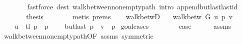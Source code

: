\begin{isabellebody}
\ \ \ \ \ \ \isamarkupfalse%
\ {\isacharparenleft}{\kern0pt}fastforce\ dest{\isacharcolon}{\kern0pt}\ walk{\isacharunderscore}{\kern0pt}between{\isacharunderscore}{\kern0pt}nonempty{\isacharunderscore}{\kern0pt}path{\isacharparenleft}{\kern0pt}{}{\isacharparenright}{\kern0pt}\ intro{\isacharcolon}{\kern0pt}\ append{\isacharunderscore}{\kern0pt}butlast{\isacharunderscore}{\kern0pt}last{\isacharunderscore}{\kern0pt}id{\isacharparenright}{\kern0pt}\isanewline
\ \ \ \ \isamarkupfalse%
\ \isamarkupfalse%
\ {\isacharquery}{\kern0pt}thesis\isanewline
\ \ \ \ \ \ \isamarkupfalse%
\ {\isacharparenleft}{\kern0pt}metis\ {\isachardoublequoteopen}{}{\isachardot}{\kern0pt}prems{\isachardoublequoteclose}{\isacharparenleft}{\kern0pt}{}{\isacharparenright}{\kern0pt}{\isacharparenright}{\kern0pt}\isanewline
\ \ \isamarkupfalse%
\isanewline
{}\isamarkupfalse%
%
\endisatagproof
{\isafoldproof}%
%
\isadelimproof
\isanewline
%
\endisadelimproof
%
\isadeliminvisible
\isanewline
%
\endisadeliminvisible
%
\isataginvisible
{}\isamarkupfalse%
\ walk{\isacharunderscore}{\kern0pt}betwD{\isacharcolon}{\kern0pt}\isanewline
\ \ \ {\isachardoublequoteopen}walk{\isacharunderscore}{\kern0pt}betw\ G\ u\ p\ v{\isachardoublequoteclose}\isanewline
\ \ \isanewline
\ \ \ \ {\isachardoublequoteopen}u\ {\isacharhash}{\kern0pt}\ tl\ p\ {\isacharequal}{\kern0pt}\ p{\isachardoublequoteclose}\isanewline
\ \ \ \ {\isachardoublequoteopen}butlast\ p\ {\isacharat}{\kern0pt}\ {\isacharbrackleft}{\kern0pt}v{\isacharbrackright}{\kern0pt}\ {\isacharequal}{\kern0pt}\ p{\isachardoublequoteclose}%
\endisataginvisible
{\isafoldinvisible}%
%
\isadeliminvisible
\isanewline
%
\endisadeliminvisible
%
\isadelimproof
%
\endisadelimproof
%
\isatagproof
{}\isamarkupfalse%
\ {\isacharparenleft}{\kern0pt}goal{\isacharunderscore}{\kern0pt}cases{\isacharparenright}{\kern0pt}\isanewline
\ \ \isamarkupfalse%
\ {}\isanewline
\ \ \isamarkupfalse%
\ {\isacharquery}{\kern0pt}case\isanewline
\ \ \ \ \isamarkupfalse%
\ assms\isanewline
\ \ \ \ \isamarkupfalse%
\ walk{\isacharunderscore}{\kern0pt}between{\isacharunderscore}{\kern0pt}nonempty{\isacharunderscore}{\kern0pt}path{\isacharparenleft}{\kern0pt}{}{\isacharparenright}{\kern0pt}{\isacharbrackleft}{\kern0pt}OF\ assms{\isacharcomma}{\kern0pt}\ symmetric{\isacharbrackright}{\kern0pt}\isanewline

\end{isabellebody}
